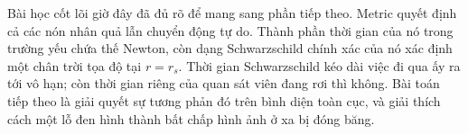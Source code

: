 \begin{classroomqa}
\end{classroomqa}

Bài học cốt lõi giờ đây đã đủ rõ để mang sang phần tiếp theo. Metric quyết định cả các nón nhân quả lẫn chuyển động tự do. Thành phần thời gian của nó trong trường yếu chứa thế Newton, còn dạng Schwarzschild chính xác của nó xác định một chân trời tọa độ tại \(r=r_s\). Thời gian Schwarzschild kéo dài việc đi qua ấy ra tới vô hạn; còn thời gian riêng của quan sát viên đang rơi thì không. Bài toán tiếp theo là giải quyết sự tương phản đó trên bình diện toàn cục, và giải thích cách một lỗ đen hình thành bất chấp hình ảnh ở xa bị đóng băng.